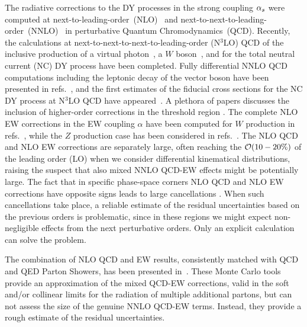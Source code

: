 \documentclass[11pt,a4paper]{article}
\begin{document}
The radiative corrections to the DY processes in the strong coupling $\alpha_{s}$
were computed
at next-to-leading-order~(NLO)~\cite{Altarelli:1979ub} and next-to-next-to-leading-order~(NNLO)~\cite{Hamberg:1990np,Harlander:2002wh} in perturbative Quantum Chromodynamics~(QCD).
Recently, the calculations at next-to-next-to-next-to-leading-order (N$^3$LO) QCD of the inclusive production of a virtual photon~\cite{Duhr:2020seh}, a $W$ boson~\cite{Duhr:2020sdp}, and for the total neutral current (NC) DY process \cite{Duhr:2021vwj} have been completed.
Fully differential NNLO QCD computations including the leptonic decay of the vector boson have been
presented in refs.~\cite{Anastasiou:2003yy,Anastasiou:2003ds,Melnikov:2006kv,Catani:2009sm,Catani:2010en},
and the first estimates of the fiducial cross sections for the NC DY process at  N$^3$LO QCD  have appeared~\cite{Camarda:2021ict}.
% 
%
A plethora of papers discusses the inclusion of higher-order corrections in
the threshold region \cite{Moch:2005ky,Ravindran:2005vv,Ravindran:2006cg,deFlorian:2012za,Ahmed:2014cla,Catani:2014uta,Li:2014afw,Ajjath:2020ulr}.
%
The complete NLO EW corrections in the EW coupling $\alpha$ have been computed for $W$ production  in refs.~\cite{Dittmaier:2001ay,Baur:2004ig,Zykunov:2006yb,Arbuzov:2005dd,CarloniCalame:2006zq},
while the $Z$ production case has been considered in refs.~\cite{Baur:2001ze,Zykunov:2005tc,CarloniCalame:2007cd,Arbuzov:2007db,Dittmaier:2009cr}.
%
%
The NLO  QCD and NLO EW corrections are separately large, often reaching the ${\cal O}(10-20\%)$ of the leading order (LO) when we consider differential kinematical distributions,
raising the suspect that also mixed NNLO QCD-EW effects might be potentially large.
The fact that in specific phase-space corners NLO QCD and NLO EW corrections have opposite signs leads to large cancellations  \cite{Balossini:2009sa}.
When such cancellations take place, a reliable estimate of the residual uncertainties based on the previous orders is problematic, since in these regions we might expect non-negligible effects from the next perturbative orders.
Only an explicit calculation can solve the problem.


The combination of NLO QCD and EW results, consistently matched with QCD and QED Parton Showers,
has been presented in~\cite{Bernaciak:2012hj,Barze:2012tt,Barze:2013fru,Frederix:2018nkq}.
These Monte Carlo tools provide an approximation of the mixed QCD-EW corrections, valid in the soft and/or collinear limits for the radiation of multiple additional partons,
but can not assess the size of the genuine NNLO QCD-EW terms. Instead, they provide a rough estimate of the residual uncertainties.
\end{document}
